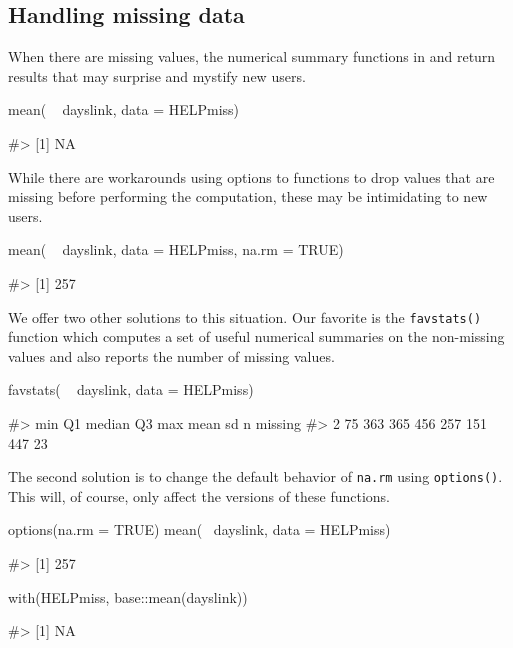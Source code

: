 \subsection{Handling missing data}\label{handling-missing-data}

When there are missing values, the numerical summary functions in
 and  return results that may surprise and mystify
new users.

\begin{Schunk}
\begin{Sinput}
mean( ~ dayslink, data = HELPmiss)
\end{Sinput}
\begin{Soutput}
#> [1] NA
\end{Soutput}
\end{Schunk}

\noindent
While there are workarounds using options to functions to drop values
that are missing before performing the computation, these may be
intimidating to new users.

\begin{Schunk}
\begin{Sinput}
mean( ~ dayslink, data = HELPmiss, na.rm = TRUE)
\end{Sinput}
\begin{Soutput}
#> [1] 257
\end{Soutput}
\end{Schunk}

We offer two other solutions to this situation. Our favorite is the
\texttt{favstats()} function which computes a set of useful numerical
summaries on the non-missing values and also reports the number of
missing values.

\begin{Schunk}
\begin{Sinput}
favstats( ~ dayslink, data = HELPmiss)
\end{Sinput}
\begin{Soutput}
#>  min Q1 median  Q3 max mean  sd   n missing
#>    2 75    363 365 456  257 151 447      23
\end{Soutput}
\end{Schunk}

The second solution is to change the default behavior of \texttt{na.rm}
using \texttt{options()}. This will, of course, only affect the
 versions of these functions.

\begin{Schunk}
\begin{Sinput}
options(na.rm = TRUE)
mean(~ dayslink, data = HELPmiss)
\end{Sinput}
\begin{Soutput}
#> [1] 257
\end{Soutput}
\begin{Sinput}
with(HELPmiss, base::mean(dayslink))
\end{Sinput}
\begin{Soutput}
#> [1] NA
\end{Soutput}
\end{Schunk}

